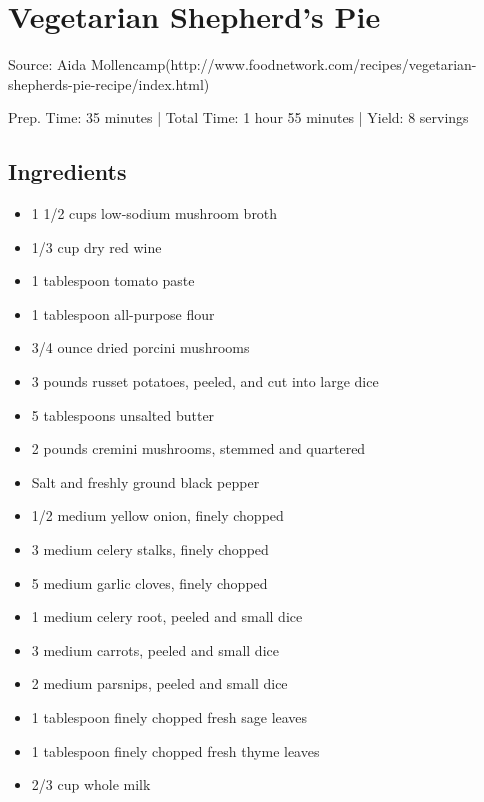 \section{Vegetarian Shepherd's Pie}

Source: Aida Mollencamp(http://www.foodnetwork.com/recipes/vegetarian-shepherds-pie-recipe/index.html)

\begin{center}
Prep. Time: 35 minutes |
Total Time: 1 hour 55 minutes | 
Yield: 8 servings
\end{center}

\subsection{Ingredients}
\begin{multicols}{2}
\begin{itemize}
    \item 1 1/2 cups low-sodium mushroom broth
    \item 1/3 cup dry red wine
    \item 1 tablespoon tomato paste
    \item 1 tablespoon all-purpose flour
    \item 3/4 ounce dried porcini mushrooms
    \item 3 pounds russet potatoes, peeled, and cut into large dice
    \item 5 tablespoons unsalted butter
    \item 2 pounds cremini mushrooms, stemmed and quartered
    \item Salt and freshly ground black pepper
    \item 1/2 medium yellow onion, finely chopped
    \item 3 medium celery stalks, finely chopped
    \item 5 medium garlic cloves, finely chopped
    \item 1 medium celery root, peeled and small dice
    \item 3 medium carrots, peeled and small dice
    \item 2 medium parsnips, peeled and small dice
    \item 1 tablespoon finely chopped fresh sage leaves
    \item 1 tablespoon finely chopped fresh thyme leaves
    \item 2/3 cup whole milk
\end{itemize}
\end{multicols}

